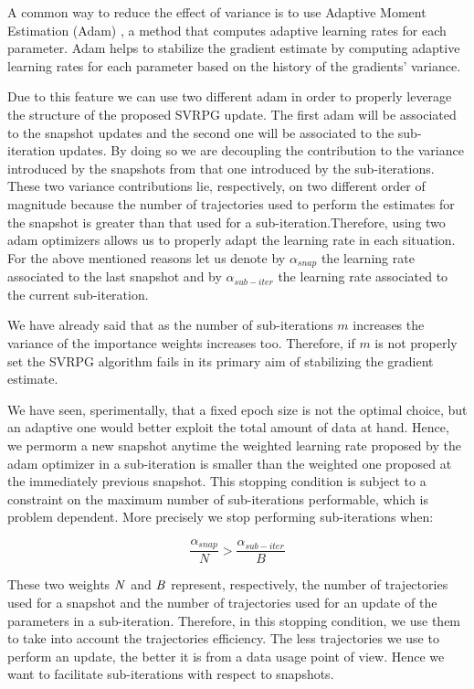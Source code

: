 \documentclass{article}
\theoremstyle{remark}
\theoremstyle{definition}
\begin{document}
A common way to reduce the effect of variance is to use Adaptive Moment Estimation (Adam) \cite{kingma2014adam}, a method that computes adaptive learning rates for each parameter. Adam helps to stabilize the gradient estimate by computing adaptive learning rates for each parameter based on the history of the gradients' variance.

Due to this feature we can use two different adam in order to properly leverage the structure of the proposed SVRPG update. The first adam will be associated to the snapshot updates and the second one will be associated to the sub-iteration updates. By doing so we are decoupling the contribution to the variance introduced by the snapshots from that one introduced by the sub-iterations. These two variance contributions lie, respectively, on two different order of magnitude because the number of trajectories used to perform the estimates for the snapshot is greater than that used for a sub-iteration.Therefore, using two adam optimizers allows us to properly adapt the learning rate in each situation. For the above mentioned reasons let us denote by $\alpha_{snap}$ the learning rate associated to the last snapshot and by  $\alpha_{sub-iter}$ the learning rate associated to the current sub-iteration.

We have already said that as the number of sub-iterations $m$ increases the variance of the importance weights increases too. Therefore, if $m$ is not properly set the SVRPG algorithm fails in its primary aim of stabilizing the gradient estimate.

We have seen, sperimentally, that a fixed epoch size is not the optimal choice, but an adaptive one would better exploit the total amount of data at hand. Hence, we permorm a new snapshot anytime the weighted learning rate proposed by the adam optimizer in a sub-iteration is smaller than the weighted one proposed at the immediately previous snapshot. This stopping condition is subject to a constraint on the maximum number of sub-iterations performable, which is problem dependent.
More precisely we stop performing sub-iterations when:

\[\frac{\alpha_{snap}}{N}>\frac{\alpha_{sub-iter}}{B}\]

These two weights ${\bf{\it N}}$ and ${\bf{\it B}}$ represent, respectively, the number of trajectories used for a snapshot and the number of trajectories used for an update of the parameters in a sub-iteration. Therefore, in this stopping condition, we use them to take into account the trajectories efficiency. The less trajectories we use to perform an update, the better it is from a data usage point of view. Hence we want to facilitate sub-iterations with respect to snapshots.
\end{document}
